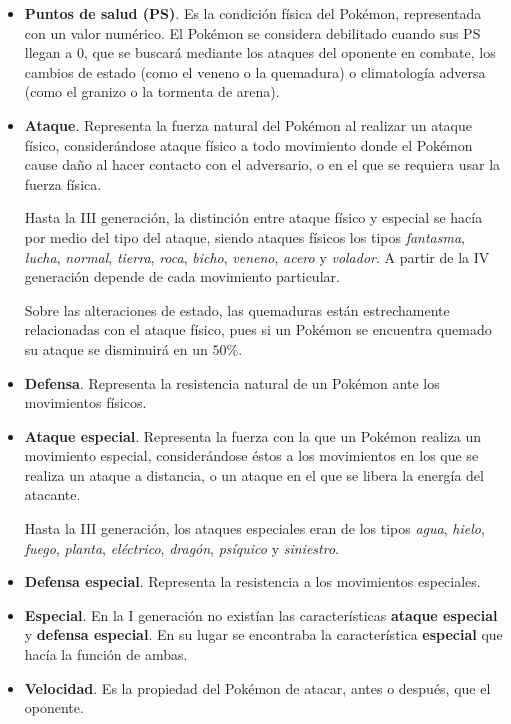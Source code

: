 \documentclass[a4paper, 11pt, titlepage]{article}
\begin{document}
    \begin{itemize}
        \item \textbf{Puntos de salud (PS)}. Es la condición física del Pokémon, representada 
        con un valor numérico. El Pokémon se considera debilitado cuando sus PS llegan a 0, que 
        se buscará mediante los ataques del oponente en combate, los cambios de estado (como 
        el veneno o la quemadura) o climatología adversa (como el granizo o la tormenta de arena).
        \item \textbf{Ataque}. Representa la fuerza natural del Pokémon al realizar un ataque físico, 
        considerándose ataque físico a todo movimiento donde el Pokémon cause daño al hacer contacto 
        con el adversario, o en el que se requiera usar la fuerza física.

        Hasta la III generación, la distinción entre ataque físico y especial se hacía por medio 
        del tipo del ataque, siendo ataques físicos los tipos \textit{fantasma}, \textit{lucha}, 
        \textit{normal}, \textit{tierra}, \textit{roca}, \textit{bicho}, \textit{veneno}, 
        \textit{acero} y \textit{volador}. A partir de la IV generación depende de cada movimiento 
        particular.

        Sobre las alteraciones de estado, las quemaduras están estrechamente relacionadas con el 
        ataque físico, pues si un Pokémon se encuentra quemado su ataque se disminuirá en un $50\%$.
        \item \textbf{Defensa}. Representa la resistencia natural de un Pokémon ante los movimientos 
        físicos.
        \item \textbf{Ataque especial}. Representa la fuerza con la que un Pokémon realiza un movimiento 
        especial, considerándose éstos a los movimientos en los que se realiza un ataque a distancia, o 
        un ataque en el que se libera la energía del atacante.

        Hasta la III generación, los ataques especiales eran de los tipos \textit{agua}, \textit{hielo},
        \textit{fuego}, \textit{planta}, \textit{eléctrico}, \textit{dragón}, \textit{psíquico} y 
        \textit{siniestro}.
        \item \textbf{Defensa especial}. Representa la resistencia a los movimientos especiales.
        \item \textbf{Especial}. En la I generación no existían las características \textbf{ataque especial}
        y \textbf{defensa especial}. En su lugar se encontraba la característica \textbf{especial} que hacía 
        la función de ambas.
        \item \textbf{Velocidad}. Es la propiedad del Pokémon de atacar, antes o después, que el oponente.
        

\end{itemize}
\end{document}
